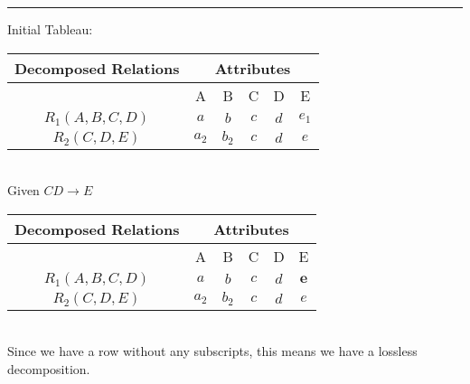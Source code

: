 \documentclass[12pt]{article}
\begin{document}
\noindent\rule{\textwidth}{1pt}
Initial Tableau:\\[0.5cm]
\begin{tabular}{|c||c|c|c|c|c|}
    \hline
    {\cellcolor{gray!25}Decomposed Relations} & \multicolumn{5}{c|}{\cellcolor{gray!25}Attributes}                             \\
    \hline
    \hline
    {\cellcolor{gray!25}}                     &
    {\cellcolor{gray!25}A}                    &
    {\cellcolor{gray!25}B}                    &
    {\cellcolor{gray!25}C}                    &
    {\cellcolor{gray!25}D}                    &
    {\cellcolor{gray!25}E}                                                                                                     \\
    \hline
    \hline
    $R_1 (A, B, C, D)$                        & $a$                                                & $b$   & $c$ & $d$ & $e_1$ \\
    \hline
    $R_2 (C, D, E)$                           & $a_2$                                              & $b_2$ & $c$ & $d$ & $e$   \\
    \hline
\end{tabular}\\[0.5cm]
Given $CD \rightarrow E$\\[0.5cm]
\begin{tabular}{|c||c|c|c|c|c|}
    \hline
    {\cellcolor{gray!25}Decomposed Relations} & \multicolumn{5}{c|}{\cellcolor{gray!25}Attributes}                                \\
    \hline
    \hline
    {\cellcolor{gray!25}}                     &
    {\cellcolor{gray!25}A}                    &
    {\cellcolor{gray!25}B}                    &
    {\cellcolor{gray!25}C}                    &
    {\cellcolor{gray!25}D}                    &
    {\cellcolor{gray!25}E}                                                                                                        \\
    \hline
    \hline
    $R_1 (A, B, C, D)$                        & $a$                                                & $b$   & $c$ & $d$ & $\bm{e}$ \\
    \hline
    $R_2 (C, D, E)$                           & $a_2$                                              & $b_2$ & $c$ & $d$ & $e$      \\
    \hline
\end{tabular}\\[0.5cm]
Since we have a row without any subscripts, this means we have a lossless decomposition.
\end{document}
